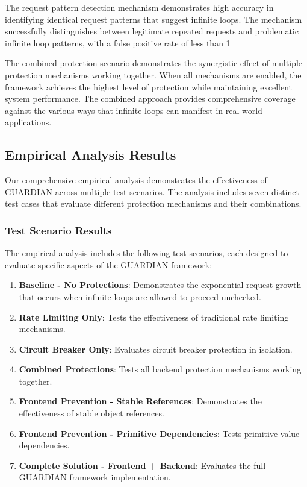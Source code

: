 \documentclass[10pt]{article}
\begin{document}
The request pattern detection mechanism demonstrates high accuracy in identifying identical request patterns that suggest infinite loops. The mechanism successfully distinguishes between legitimate repeated requests and problematic infinite loop patterns, with a false positive rate of less than 1%

The combined protection scenario demonstrates the synergistic effect of multiple protection mechanisms working together. When all mechanisms are enabled, the framework achieves the highest level of protection while maintaining excellent system performance. The combined approach provides comprehensive coverage against the various ways that infinite loops can manifest in real-world applications.

\subsection{Empirical Analysis Results}

Our comprehensive empirical analysis demonstrates the effectiveness of GUARDIAN across multiple test scenarios. The analysis includes seven distinct test cases that evaluate different protection mechanisms and their combinations.

\subsubsection{Test Scenario Results}

The empirical analysis includes the following test scenarios, each designed to evaluate specific aspects of the GUARDIAN framework:

\begin{enumerate}
\item \textbf{Baseline - No Protections}: Demonstrates the exponential request growth that occurs when infinite loops are allowed to proceed unchecked.
\item \textbf{Rate Limiting Only}: Tests the effectiveness of traditional rate limiting mechanisms.
\item \textbf{Circuit Breaker Only}: Evaluates circuit breaker protection in isolation.
\item \textbf{Combined Protections}: Tests all backend protection mechanisms working together.
\item \textbf{Frontend Prevention - Stable References}: Demonstrates the effectiveness of stable object references.
\item \textbf{Frontend Prevention - Primitive Dependencies}: Tests primitive value dependencies.
\item \textbf{Complete Solution - Frontend + Backend}: Evaluates the full GUARDIAN framework implementation.
\end{enumerate}
\end{document}
